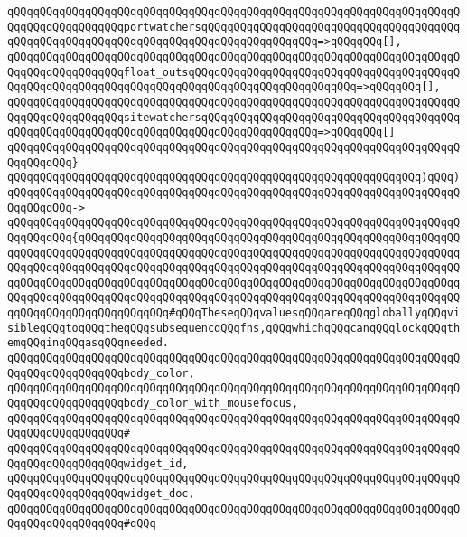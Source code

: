 \verb|qQQqqQQqqQQqqQQqqQQqqQQqqQQqqQQqqQQqqQQqqQQqqQQqqQQqqQQqqQQqqQQqqQQqqQQqqQQqqQQqqQQqqQQqportwatchersqQQqqQQqqQQqqQQqqQQqqQQqqQQqqQQqqQQqqQQqqQQqqQQqqQQqqQQqqQQqqQQqqQQqqQQqqQQqqQQqqQQqqQQq=>qQQqqQQq[],|\newline
\verb|qQQqqQQqqQQqqQQqqQQqqQQqqQQqqQQqqQQqqQQqqQQqqQQqqQQqqQQqqQQqqQQqqQQqqQQqqQQqqQQqqQQqqQQqfloat_outsqQQqqQQqqQQqqQQqqQQqqQQqqQQqqQQqqQQqqQQqqQQqqQQqqQQqqQQqqQQqqQQqqQQqqQQqqQQqqQQqqQQqqQQqqQQqqQQq=>qQQqqQQq[],|\newline
\verb|qQQqqQQqqQQqqQQqqQQqqQQqqQQqqQQqqQQqqQQqqQQqqQQqqQQqqQQqqQQqqQQqqQQqqQQqqQQqqQQqqQQqqQQqsitewatchersqQQqqQQqqQQqqQQqqQQqqQQqqQQqqQQqqQQqqQQqqQQqqQQqqQQqqQQqqQQqqQQqqQQqqQQqqQQqqQQqqQQqqQQq=>qQQqqQQq[]|\newline
\verb|qQQqqQQqqQQqqQQqqQQqqQQqqQQqqQQqqQQqqQQqqQQqqQQqqQQqqQQqqQQqqQQqqQQqqQQqqQQqqQQq}|\newline
\verb|qQQqqQQqqQQqqQQqqQQqqQQqqQQqqQQqqQQqqQQqqQQqqQQqqQQqqQQqqQQqqQQq)qQQq)|\newline
\verb|qQQqqQQqqQQqqQQqqQQqqQQqqQQqqQQqqQQqqQQqqQQqqQQqqQQqqQQqqQQqqQQqqQQqqQQqqQQqqQQq->|\newline
\verb|qQQqqQQqqQQqqQQqqQQqqQQqqQQqqQQqqQQqqQQqqQQqqQQqqQQqqQQqqQQqqQQqqQQqqQQqqQQqqQQq{qQQqqQQqqQQqqQQqqQQqqQQqqQQqqQQqqQQqqQQqqQQqqQQqqQQqqQQqqQQqqQQqqQQqqQQqqQQqqQQqqQQqqQQqqQQqqQQqqQQqqQQqqQQqqQQqqQQqqQQqqQQqqQQqqQQqqQQqqQQqqQQqqQQqqQQqqQQqqQQqqQQqqQQqqQQqqQQqqQQqqQQqqQQqqQQqqQQqqQQqqQQqqQQqqQQqqQQqqQQqqQQqqQQqqQQqqQQqqQQqqQQqqQQqqQQqqQQqqQQqqQQqqQQqqQQqqQQqqQQqqQQqqQQqqQQqqQQqqQQqqQQqqQQqqQQqqQQqqQQqqQQqqQQqqQQqqQQqqQQqqQQqqQQqqQQqqQQqqQQqqQQq#qQQqTheseqQQqvaluesqQQqareqQQqgloballyqQQqvisibleqQQqtoqQQqtheqQQqsubsequencqQQqfns,qQQqwhichqQQqcanqQQqlockqQQqthemqQQqinqQQqasqQQqneeded.|\newline
\verb|qQQqqQQqqQQqqQQqqQQqqQQqqQQqqQQqqQQqqQQqqQQqqQQqqQQqqQQqqQQqqQQqqQQqqQQqqQQqqQQqqQQqqQQqbody_color,|\newline
\verb|qQQqqQQqqQQqqQQqqQQqqQQqqQQqqQQqqQQqqQQqqQQqqQQqqQQqqQQqqQQqqQQqqQQqqQQqqQQqqQQqqQQqqQQqbody_color_with_mousefocus,|\newline
\verb|qQQqqQQqqQQqqQQqqQQqqQQqqQQqqQQqqQQqqQQqqQQqqQQqqQQqqQQqqQQqqQQqqQQqqQQqqQQqqQQqqQQqqQQq#|\newline
\verb|qQQqqQQqqQQqqQQqqQQqqQQqqQQqqQQqqQQqqQQqqQQqqQQqqQQqqQQqqQQqqQQqqQQqqQQqqQQqqQQqqQQqqQQqwidget_id,|\newline
\verb|qQQqqQQqqQQqqQQqqQQqqQQqqQQqqQQqqQQqqQQqqQQqqQQqqQQqqQQqqQQqqQQqqQQqqQQqqQQqqQQqqQQqqQQqwidget_doc,|\newline
\verb|qQQqqQQqqQQqqQQqqQQqqQQqqQQqqQQqqQQqqQQqqQQqqQQqqQQqqQQqqQQqqQQqqQQqqQQqqQQqqQQqqQQqqQQq#qQQq|\newline
